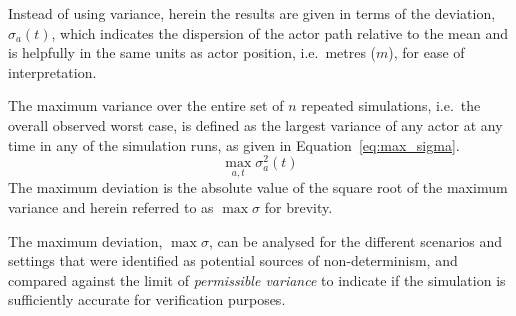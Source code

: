 \documentclass[runningheads,twocolumn,a4paper,10pt]{llncs}
\begin{document}
Instead of using variance, herein the results are given in terms of the deviation, $\sigma_a(t)$, which indicates the dispersion of the actor path relative to the mean and is helpfully in the same units as actor position, i.e.\ metres ($m$), for ease of interpretation.
%

The maximum variance over the entire set of $n$ repeated simulations, i.e.\ the overall observed worst case, is defined as the largest variance of any actor at any time in any of the simulation runs, as given in Equation~\ref{eq:max_sigma}. 
\begin{equation} \label{eq:max_sigma}
\max_{a,t}\sigma_a^{2}(t)
\end{equation}
The maximum deviation is the absolute value of the square root of the maximum variance and herein referred to as ${\max\sigma}$ for brevity. 

The maximum deviation, $\max\sigma$, can be analysed for the different scenarios and settings that were identified as potential sources of non-determinism, and compared against the limit of \textit{permissible variance} to indicate if the simulation is sufficiently accurate for verification purposes.
%
\end{document}
